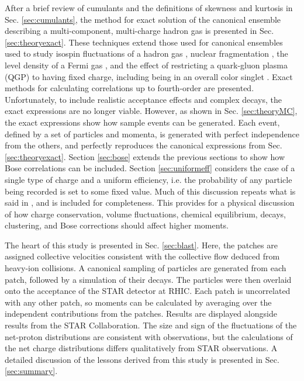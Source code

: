 After a brief review of cumulants and the definitions of skewness and kurtosis in Sec. \ref{sec:cumulants}, the method for exact solution of the canonical ensemble describing a multi-component, multi-charge hadron gas is presented in Sec. \ref{sec:theoryexact}. These techniques extend those used for canonical ensembles used to study isospin fluctuations of a hadron gas \cite{Cheng:2002jb}, nuclear fragmentation \cite{Pratt:1999ht}, the level density of a Fermi gas \cite{Pratt:1999ns}, and the effect of restricting a quark-gluon plasma (QGP) to having fixed charge, including being in an overall color singlet \cite{Pratt:2003jd}. Exact methods for calculating correlations up to fourth-order are presented. Unfortunately, to include realistic acceptance effects and complex decays, the exact expressions are no longer viable. However, as shown in Sec. \ref{sec:theoryMC}, the exact expressions show how sample events can be generated. Each event, defined by a set of particles and momenta, is generated with perfect independence from the others, and perfectly reproduces the canonical expressions from Sec. \ref{sec:theoryexact}. Section \ref{sec:bose} extends the previous sections to show how Bose correlations can be included. Section \ref{sec:uniformeff} considers the case of a single type of charge and a uniform efficiency, i.e. the probability of any particle being recorded is set to some fixed value. Much of this discussion repeats what is said in \cite{Savchuck:2019xfg}, and is included for completeness. This provides for a physical discussion of how charge conservation, volume fluctuations, chemical equilibrium, decays, clustering, and Bose corrections should affect higher moments.

The heart of this study is presented in Sec. \ref{sec:blast}. Here, the patches are assigned collective velocities consistent with the collective flow deduced from heavy-ion collisions. A canonical sampling of particles are generated from each patch, followed by a simulation of their decays. The particles were then overlaid onto the acceptance of the STAR detector at RHIC. Each patch is uncorrelated with any other patch, so moments can be calculated by averaging over the independent contributions from the patches. Results are displayed alongside results from the STAR Collaboration. The size and sign of the fluctuations of the net-proton distributions are consistent with observations, but the calculations of the net charge distributions differs qualitatively from STAR observations. A detailed discussion of the lessons derived from this study is presented in Sec. \ref{sec:summary}.
